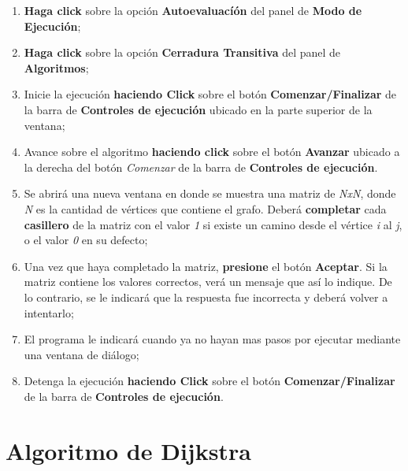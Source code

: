 \documentclass{book}
\begin{document}
\begin{enumerate}
	\itemsep=8pt \topsep=0pt \partopsep=0pt \parskip=0pt \parsep=0pt

	\item \textbf{Haga click} sobre la opción \textbf{Autoevaluacíón} del panel de \textbf{Modo de Ejecución};

	\item \textbf{Haga click} sobre la opción \textbf{Cerradura Transitiva} del panel de \textbf{Algoritmos};

	\item Inicie la ejecución \textbf{haciendo Click} sobre el botón \textbf{Comenzar/Finalizar} de la barra de \textbf{Controles de ejecución} ubicado en la parte superior de la ventana;

	\item Avance sobre el algoritmo \textbf{haciendo click} sobre el botón \textbf{Avanzar} ubicado a la derecha del botón \textit{Comenzar} de la barra de \textbf{Controles de ejecución}.

	\item Se abrirá una nueva ventana en donde se muestra una matriz de \textit{NxN}, donde \textit{N} es la cantidad de vértices que contiene el grafo. Deberá \textbf{completar} cada \textbf{casillero} de la matriz con el valor \textit{1} si existe un camino desde el vértice \textit{i} al \textit{j}, o el valor \textit{0} en su defecto;

	\item Una vez que haya completado la matriz, \textbf{presione} el botón \textbf{Aceptar}. Si la matriz contiene los valores correctos, verá un mensaje que así lo indique. De lo contrario, se le indicará que la respuesta fue incorrecta y deberá volver a intentarlo;

	\item El programa le indicará cuando ya no hayan mas pasos por ejecutar mediante una ventana de diálogo;

	\item Detenga la ejecución \textbf{haciendo Click} sobre el botón \textbf{Comenzar/Finalizar} de la barra de \textbf{Controles de ejecución}.

\end{enumerate}
\medskip





%
%
\chapter{Algoritmo de Dijkstra}
\end{document}
